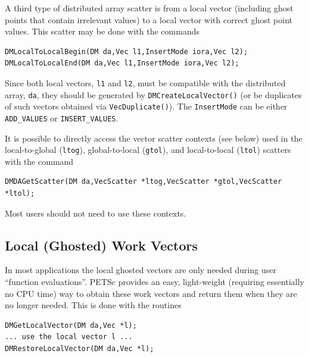 A third type of distributed array scatter is from a local
vector (including ghost points that contain irrelevant values) to
a local vector with correct ghost point values.
This scatter may be done with the commands
\begin{lstlisting}
DMLocalToLocalBegin(DM da,Vec l1,InsertMode iora,Vec l2);
DMLocalToLocalEnd(DM da,Vec l1,InsertMode iora,Vec l2);
\end{lstlisting}
Since both local vectors, \lstinline{l1} and \lstinline{l2},
must be compatible with the distributed array, \lstinline{da}, they should be
generated by \lstinline{DMCreateLocalVector()}
(or be duplicates of such vectors obtained via \lstinline{VecDuplicate()}).
The \lstinline{InsertMode} can be either \lstinline{ADD_VALUES} or \lstinline{INSERT_VALUES}.

It is possible to directly access the vector scatter contexts (see below)
used in the local-to-global (\lstinline{ltog}), global-to-local
(\lstinline{gtol}), and local-to-local (\lstinline{ltol})
scatters with the command
\begin{lstlisting}
DMDAGetScatter(DM da,VecScatter *ltog,VecScatter *gtol,VecScatter *ltol);
\end{lstlisting}
Most users should not need to use these contexts.

\subsection{Local (Ghosted) Work Vectors}
In most applications the local ghosted vectors are only needed during user
``function evaluations''. PETSc provides an easy, light-weight (requiring
essentially no CPU time) way to obtain these work vectors and return them when
they are no longer needed. This is done with the routines
\begin{lstlisting}
DMGetLocalVector(DM da,Vec *l);
... use the local vector l ...
DMRestoreLocalVector(DM da,Vec *l);
\end{lstlisting}

